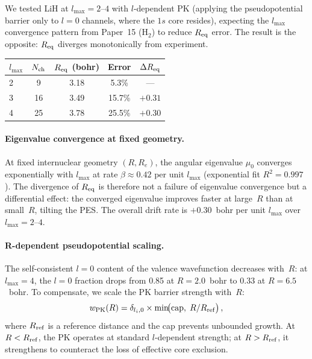 \documentclass[aps,pra,twocolumn,superscriptaddress,longbibliography,floatfix]{revtex4-2}
\begin{document}
We tested LiH at $l_{\max} = 2$--$4$ with $l$-dependent PK
(applying the pseudopotential barrier only to $l = 0$ channels,
where the $1s$ core resides), expecting the $l_{\max}$
convergence pattern from Paper~15 (H$_2$) to reduce $R_{\rm eq}$
error.  The result is the opposite: $R_{\rm eq}$ diverges
monotonically from experiment.

\begin{center}
\begin{tabular}{lcccc}
\hline
$l_{\max}$ & $N_{\rm ch}$ & $R_{\rm eq}$ (bohr) & Error &
  $\Delta R_{\rm eq}$ \\
\hline
2 &  9 & 3.18 &  5.3\% & --- \\
3 & 16 & 3.49 & 15.7\% & $+0.31$ \\
4 & 25 & 3.78 & 25.5\% & $+0.30$ \\
\hline
\end{tabular}
\end{center}

\paragraph{Eigenvalue convergence at fixed geometry.}
At fixed internuclear geometry $(R, R_e)$, the angular eigenvalue
$\mu_0$ converges exponentially with $l_{\max}$ at rate
$\beta \approx 0.42$ per unit $l_{\max}$ (exponential fit
$R^2 = 0.997$).  The divergence of $R_{\rm eq}$ is therefore not a
failure of eigenvalue convergence but a differential effect: the
converged eigenvalue improves faster at large~$R$ than at
small~$R$, tilting the PES.  The overall drift rate is
$+0.30$~bohr per unit $l_{\max}$ over $l_{\max} = 2$--$4$.

\paragraph{R-dependent pseudopotential scaling.}
\label{par:rdep_pk}
The self-consistent $l = 0$ content of the valence wavefunction
decreases with~$R$: at $l_{\max} = 4$, the $l = 0$ fraction drops
from 0.85 at $R = 2.0$~bohr to 0.33 at $R = 6.5$~bohr.  To
compensate, we scale the PK barrier strength with~$R$:
\begin{equation}
  w_{\rm PK}(R) = \delta_{l_i, 0} \times
    \min\!\bigl(\text{cap},\; R/R_{\rm ref}\bigr)\,,
  \label{eq:rdep_pk}
\end{equation}
where $R_{\rm ref}$ is a reference distance and the cap prevents
unbounded growth.  At $R < R_{\rm ref}$, the PK operates at
standard $l$-dependent strength; at $R > R_{\rm ref}$, it
strengthens to counteract the loss of effective core exclusion.
\end{document}
